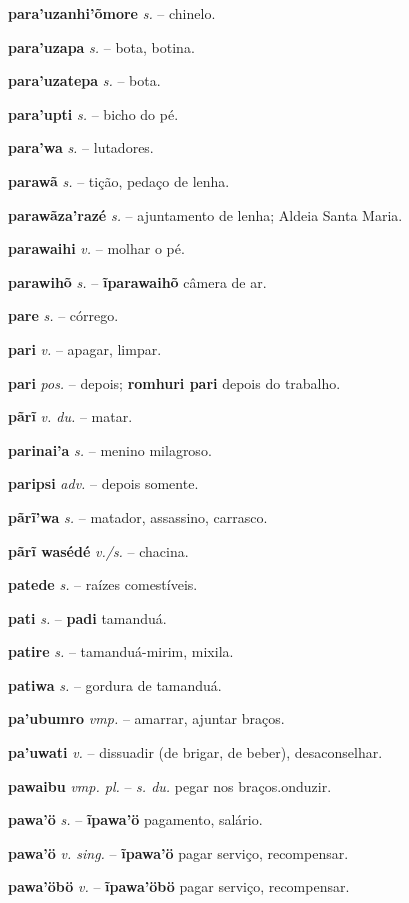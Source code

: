 \textbf{para'uzanhi'õmore} \textit{s.} -- chinelo.

\textbf{para'uzapa} \textit{s.} -- bota, botina.

\textbf{para'uzatepa} \textit{s.} -- bota.

\textbf{para'upti} \textit{s.} -- bicho do pé.

\textbf{para'wa} \textit{s.} -- lutadores.

\textbf{parawã} \textit{s.} -- tição, pedaço de lenha.

\textbf{parawãza'razé} \textit{s.} -- ajuntamento de lenha; Aldeia Santa Maria.

\textbf{parawaihi} \textit{v.} -- molhar o pé.

\textbf{parawihõ} \textit{s.} -- \textbf{ĩparawaihõ} câmera de ar.

\textbf{pare} \textit{s.} -- córrego.

\textbf{pari} \textit{v.} -- apagar, limpar.

\textbf{pari} \textit{pos.} -- depois; \textbf{romhuri pari} depois do trabalho.

\textbf{pãrĩ} \textit{v. du.} -- matar.

\textbf{parinai'a} \textit{s.} -- menino milagroso.

\textbf{paripsi} \textit{adv.} -- depois somente.

\textbf{pãrĩ'wa} \textit{s.} -- matador, assassino, carrasco.

\textbf{pãrĩ wasédé} \textit{v./s.} -- chacina.

\textbf{patede} \textit{s.} -- raízes comestíveis.

\textbf{pati} \textit{s.} -- \textbf{padi} tamanduá.

\textbf{patire} \textit{s.} -- tamanduá-mirim, mixila.

\textbf{patiwa} \textit{s.} -- gordura de tamanduá.

\textbf{pa'ubumro} \textit{vmp.} -- amarrar, ajuntar braços.

\textbf{pa'uwati} \textit{v.} -- dissuadir (de brigar, de beber), desaconselhar.

\textbf{pawaibu} \textit{vmp. pl.} -- \textit{s. du.} pegar nos braços.onduzir.

\textbf{pawa'ö} \textit{s.} -- \textbf{ĩpawa'ö} pagamento, salário.

\textbf{pawa'ö} \textit{v. sing.} -- \textbf{ĩpawa'ö} pagar serviço, recompensar.

\textbf{pawa'öbö} \textit{v.} -- \textbf{ĩpawa'öbö} pagar serviço, recompensar.

